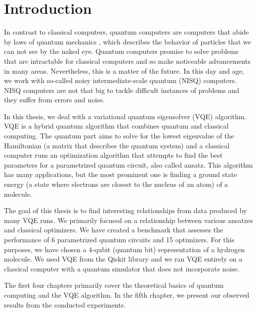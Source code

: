 \chapter*{Introduction}

In contrast to classical computers, quantum computers are computers that abide by laws of quantum mechanics , which describes the behavior of particles that we can not see by the naked eye. Quantum computers promise to solve problems that are intractable for classical computers \cite{Peruzzo} and so make noticeable advancements in many areas. Nevertheless, this is a matter of the future. In this day and age, we work with so-called noisy intermediate-scale quantum (NISQ) computers. NISQ computers are not that big to tackle difficult instances of problems and they suffer from errors and noise.

In this thesis, we deal with a variational quantum eigensolver (VQE) algorithm. VQE is a hybrid quantum algorithm that combines quantum and classical computing. The quantum part aims to solve for the lowest eigenvalue  of the Hamiltonian (a matrix that describes the quantum system) and a classical computer runs an optimization algorithm that attempts to find the best parameters for a parametrized quantum circuit, also called ansatz. This algorithm has many applications, but the most prominent one is finding a ground state energy (a state where electrons are closest to the nucleus of an atom) of a molecule.

The goal of this thesis is to find interesting relationships from data produced by many VQE runs. We primarily focused on a relationship between various ansatzes and classical optimizers. We have created a benchmark  that assesses the performance of 6 parametrized quantum circuits and 15 optimizers.  For this purposes, we have chosen a 4-qubit (quantum bit) representation of a hydrogen molecule. We used VQE from the Qiskit library and we ran VQE entirely on a classical computer with a quantum simulator that does not incorporate noise.

The first four chapters primarily cover the theoretical basics of quantum computing and the VQE algorithm. In the fifth chapter, we present our observed results from the conducted experiments.

